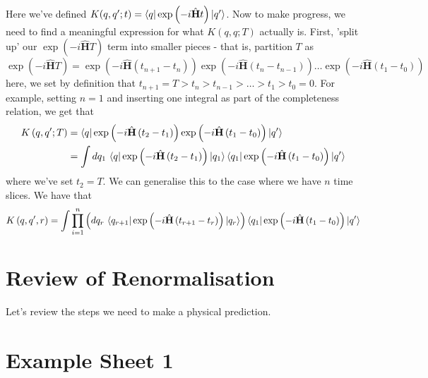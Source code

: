 \documentclass[11pt, oneside]{article}   	%
\theoremstyle{slanted}
\renewcommand{\op}[1]{\hat{\mathbf{#1}}}
\begin{document}
Here we've defined $ K ( q , q '; t )  = \bra{q}\exp\left(  - i \op{H } t  \right) \ket{ q ' } $. 
Now to make progress, we need to find
a meaningful expression for what $ K \left( q, q ; T \right)  $ 
actually is. First, 'split up' 
our $ \exp (  - i \op{H } T)$ term into smaller pieces - 
that is, partition $ T $ as 
\begin{equation}
	\exp\left(  - i \op{H } T  \right)  = 
	\exp \left(  - i \op{H } \left( t_{ n + 1 }  - t _ n  \right)   \right) \exp \left(  - i \op{H } \left( t_n  - t_{ n - 1 }  \right)   \right)  \dots \exp\left(  - i \op{H } \left( t _ 1  - t _ 0  \right)   \right)  
\end{equation} here, we set by definition that 
$ t_{ n + 1 }  =T  > t _ n > t _{ n - 1 } > \dots > t _ 1 > t _ 0 = 0 $. For example, setting $ n = 1$ and inserting one 
integral as part of the completeness relation, 
we get that 
\begin{align*}
	K \left( q, q' ; T  \right)  &=  
	\bra{ q }\exp\left(  - i \op{H } \left( t_2 - t_1  \right)  \right) \exp\left(  - i \op{ H } \left( t_1  - t_0   \right)   \right) \ket{q ' }  \\
	&=  \int d q_1 \,  
	\bra{ q } \exp\left(  - i \op{H } \left( t_2  - t_1  \right) \right)\ket{q_1 } \bra{q_1 } \exp\left( - i \op{H } \left( t_1  - t_0  \right)   \right)\ket{q ' } 
\end{align*}
where we've set $ t_2 = T $. We can generalise this 
to the case where we have $ n $ time slices. We 
have that 
\begin{equation}
	K\left( q, q' , r  \right)   = 
	\int \prod_{ i = 1 } ^ n \left( d q _  r \, 
	\bra{q _{ r +  1} } \exp \left(  - i \op{ H } 
\left(  t _{ r + 1 }  - t _ r  \right)  \right) \ket{q _ r }\right)\bra{q _  1}\exp\left(  - i \op{H } \left( t_1 - t_0  \right)   \right) \ket{q ' } 
\end{equation}


\pagebreak 

\section{Review of Renormalisation}
Let's review the steps 
we need to make a physical prediction. 


\pagebreak
\section*{Example Sheet 1}
\end{document}
